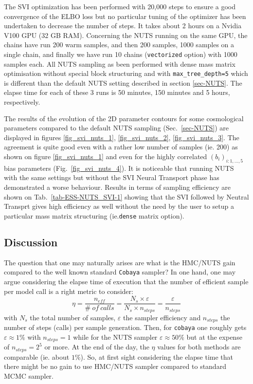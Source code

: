 \documentclass[final,5p,times,twocolumn,authoryear]{elsarticle}
\begin{document}
The SVI optimization has been performed with 20,000 steps to ensure a good convergence of the ELBO loss but no particular tuning of the optimizer has been undertaken to decrease the number of steps. It takes about 2 hours on a Nvidia V100 GPU (32 GB RAM). Concerning the NUTS running on the same GPU, the chains have run 200 warm samples, and then 200 samples, 1000 samples on a single chain, and finally we have run 10 chains (\texttt{vectorized} option) with 1000 samples each. All NUTS sampling as been performed with dense mass matrix optimisation without special block structuring and with \texttt{max\_tree\_depth=5} which is different than the default NUTS setting described in section \ref{sec-NUTS}. 
The elapse time for each of these 3 runs is 50 minutes, 150 minutes and 5 hours, respectively. 

The results of the evolution of the 2D parameter contours for some cosmological parameters compared to the default NUTS sampling (Sec.~\ref{sec-NUTS}) are displayed in figures \ref{fig_svi_nuts_1}, \ref{fig_svi_nuts_2}, \ref{fig_svi_nuts_3}. The agreement is quite good even with a rather low number of samples (ie. 200) as shown on figure \ref{fig_svi_nuts_1} and even for the highly correlated $(b_i)_{i:1,\dots,5}$ bias parameters (Fig.~\ref{fig_svi_nuts_4}). It is noticeable that running NUTS with the same settings  but without the SVI Neural Transport phase has demonstrated a worse behaviour.  Results in terms of sampling efficiency are shown on Tab.~\ref{tab-ESS-NUTS_SVI-1} showing that the SVI followed by Neutral Transprt gives high efficiency as well without the need by the user to setup a particular mass matrix structuring (ie.\texttt{dense} matrix option). 
%
\subsection{Discussion}
%
The question that one may naturally arises are what is the HMC/NUTS gain compared to the well known standard \texttt{Cobaya} sampler? 
In one hand, one may argue considering the elapse time of execution that the number of efficient sample per model call is a right metric to consider: 
\begin{equation}
    \eta = \frac{n_{eff}}{\#\ of\ calls} = \frac{N_s \times \varepsilon}{N_s \times n_{steps}} = \frac{\varepsilon}{n_{steps}}
\end{equation}
with $N_s$ the total number of samples, $\varepsilon$ the sampler efficiency and $n_{steps}$ the number of steps (calls) per sample generation. Then, for \texttt{cobaya} one roughly gets $\varepsilon\approx 1\%$ with $n_{steps}=1$ while for the NUTS sampler $\varepsilon\approx 50\%$ but at the expense of $n_{steps}=2^5$ or more. At the end of the day, the $\eta$ values for both methods are comparable (ie. about $1\%$). So, at first sight considering the elapse time that there might be no gain to use HMC/NUTS sampler compared to standard MCMC sampler.  
\end{document}
